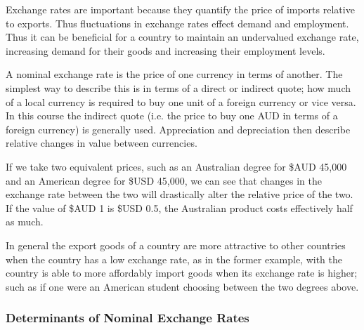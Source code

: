 \documentclass[12pt]{report}
\begin{document}
\begin{flushleft}
Exchange rates are important because they quantify the price of imports
relative to exports. Thus fluctuations in exchange rates effect demand and
employment. Thus it can be beneficial for a country to maintain an undervalued
exchange rate, increasing demand for their goods and increasing their
employment levels. \par
A nominal exchange rate is the price of one currency in terms of another. The
simplest way to describe this is in terms of a direct or indirect quote; how
much of a local currency is required to buy one unit of a foreign currency 
or vice versa. In this course the indirect quote (i.e. the price to buy one AUD
in terms of a foreign currency) is generally used. Appreciation and
depreciation then describe relative changes in value between currencies. \par
If we take two equivalent prices, such as an Australian degree for \$AUD 45,000
and an American degree for \$USD 45,000, we can see that changes in the
exchange rate between the two will drastically alter the relative price of the
two. If the value of \$AUD 1 is \$USD 0.5, the Australian product costs
effectively half as much. \par
In general the export goods of a country are more
attractive to other countries when the country has a low exchange rate, as in
the former example, with the country is able to more affordably import goods
when its exchange rate is higher; such as if one were an American student
choosing between the two degrees above.

\subsubsection*{Determinants of Nominal Exchange Rates}


\end{flushleft}
\end{document}
